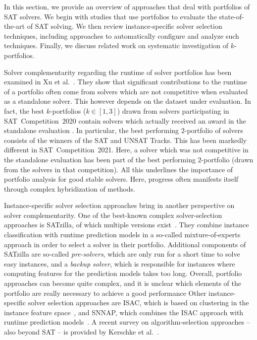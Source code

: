 \documentclass[conference]{IEEEtran}
\begin{document}
In this section, we provide an overview of approaches that deal with portfolios of SAT solvers. 
We begin with studies that use portfolios to evaluate the state-of-the-art of SAT solving. 
We then review instance-specific solver selection techniques, including approaches to automatically configure and analyze such techniques. 
Finally, we discuss related work on systematic investigation of $k$-portfolios. 

Solver complementarity regarding the runtime of solver portfolios has been examined in Xu et al.~\cite{Xu:2012:EvalContribVBS}. 
They show that significant contributions to the runtime of a portfolio often come from solvers which are not competitive when evaluated as a standalone solver. 
This however depends on the dataset under evaluation. 
In fact, the best $k$-portfolios ($k \in [1,3]$) drawn from solvers participating in SAT~Competition~2020 contain solvers which actually received an award in the standalone evaluation \cite{SC2020:AIJ}.
In particular, the best performing $2$-portfolio of solvers consists of the winners of the SAT and UNSAT Tracks. 
This has been markedly different in SAT~Competition~2021.
Here, a solver which was not competitive in the standalone evaluation has been part of the best performing $2$-portfolio (drawn from the solvers in that competition). 
All this underlines the importance of portfolio analysis for good stable solvers. Here, progress often manifests itself through complex hybridization of methods. 

Instance-specific solver selection approaches bring in another perspective on solver complementarity.
One of the best-known complex solver-selection approaches is SATzilla, of which multiple versions exist~\cite{xu2008satzilla, xu2012satzilla2012}. 
They combine instance classification with runtime prediction models in a so-called mixture-of-experts approach in order to select a solver in their portfolio. 
Additional components of SATzilla are so-called \emph{pre-solvers}, which are only run for a short time to solve easy instances, and a \emph{backup solver}, which is responsible for instances where computing features for the prediction models takes too long.
Overall, portfolio approaches can become quite complex, and it is unclear which elements of the portfolio are really necessary to achieve a good performance 
Other instance-specific solver selection approaches are ISAC, which is based on clustering in the instance feature space~\cite{Kadioglu:2010:ISAC}, and SNNAP, which combines the ISAC approach with runtime prediction models~\cite{Collautti:2013:SNNAP}.
A recent survey on algorithm-selection approaches -- also beyond SAT -- is provided by Kerschke et al.~\cite{kerschke2019automated}.
\end{document}
